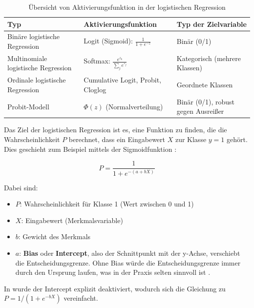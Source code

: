 \begin{table}[ht]
    \centering
        \begin{tabular}{|p{4.4cm}|p{4.4cm}|p{4.4cm}|}
        \hline
        \textbf{Typ} & \textbf{Aktivierungsfunktion} & \textbf{Typ der Zielvariable}\\
        \hline
        Binäre logistische Regression & Logit (Sigmoid): $\frac{1}{1 + e^{-z}}$ & Binär (0/1) \\
        \hline
        Multinomiale logistische Regression & Softmax: $\frac{e^{z_k}}{\sum_j e^{z_j}}$ & Kategorisch (mehrere Klassen) \\
        \hline
        Ordinale logistische Regression & Cumulative Logit, Probit, Cloglog & Geordnete Klassen \\
        \hline
        Probit-Modell & $\Phi(z)$ (Normalverteilung) & Binär (0/1), robust gegen Ausreißer \\
        \hline
        \end{tabular}
\caption{Übersicht von Aktivierungsfunktion in der logistischen Regression \cite{jurafsky2023, hastie2009, agresti2018cda}}
\label{tab:linkfunktionen}
\end{table}

Das Ziel der logistischen Regression ist es, eine Funktion zu finden, die die Wahrscheinlichkeit \( P \) berechnet, 
dass ein Eingabewert \( X \) zur Klasse \( y = 1 \) gehört. Dies geschieht zum Beispiel mittels der Sigmoidfunktion \cite{jurafsky2023}:

\begin{equation}
    P = \frac{1}{1 + e^{-(a + bX)}}
\end{equation}

Dabei sind:
\begin{itemize}
  \item \( P \): Wahrscheinlichkeit für Klasse 1 (Wert zwischen 0 und 1)
  \item \( X \): Eingabewert (Merkmalsvariable)
  \item \( b \): Gewicht des Merkmals
  \item \( a \): \textbf{Bias} oder \textbf{Intercept}, also der Schnittpunkt mit der y-Achse, verschiebt die Entscheidungsgrenze. 
  Ohne Bias würde die Entscheidungsgrenze immer durch den Ursprung laufen, was in der Praxis selten sinnvoll ist \cite{geron2019}.
\end{itemize}

In \cite{elchami2025} wurde der Intercept explizit deaktiviert, wodurch sich die Gleichung zu \( P = 1 / (1 + e^{-bX}) \) vereinfacht.

